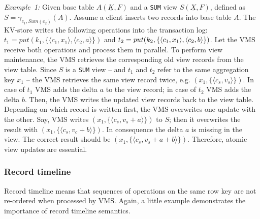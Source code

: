 \noindent
\textit{Example~1:} Given base table $A(\underline{K}, F)$ and a \texttt{SUM} 
view $S(\underline{X}, F)$, defined as $S=\gamma_{c_1,Sum(c_2)}(A)$. 
Assume a client inserts two records into base table $A$. The KV-store writes the following 
operations into the transaction log: $t_1=put(k_1,\{\langle 
c_1,x_1\rangle,\langle c_2,a\rangle\})$ and $t_2=put(k_2, \{\langle 
c_1,x_1 \rangle,\linebreak \langle c_2,b\rangle\})$. Let the VMS receive both 
operations and process them in parallel. To perform view maintenance, 
the VMS retrieves the corresponding old view records from the view 
table. Since $S$ is a \texttt{SUM} view -- and $t_1$ and $t_2$ refer to 
the same aggregation key $x_1$ -- the VMS retrieves the same view record 
twice, e.g. $(x_1, \{\langle c_s, v_s\rangle\})$. In case of $t_1$ VMS 
adds the delta $a$ to the view record; in case of $t_2$ VMS adds the 
delta $b$. Then, the VMS writes the updated view records back to the 
view table. Depending on which record is written first, the VMS 
overwrites one update with the other. Say, VMS writes $(x_1, \{\langle 
c_s, v_s+a \rangle\})$ to $S$; then it overwrites the result with 
$(x_1,\{\langle c_s, v_c+b\rangle\})$. In consequence the delta $a$ is 
missing in the view. The correct result should be $(x_1,\{\langle c_s, 
v_s+a+b \rangle\})$. Therefore, atomic view updates are essential. 



%

\subsubsection{Record timeline}
\label{subsubsec:record_timeline} 

Record timeline means that sequences of operations on the same row key are not re-ordered 
when processed by VMS.  Again, a little example demonstrates the
importance of record timeline semantics.

